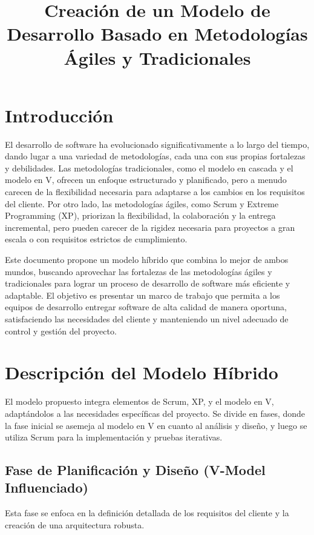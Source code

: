\documentclass{article}
\title{Creación de un Modelo de Desarrollo Basado en Metodologías Ágiles y Tradicionales}
\author{}
\date{}
\begin{document}
\maketitle

\section{Introducción}

El desarrollo de software ha evolucionado significativamente a lo largo del tiempo, dando lugar a una variedad de metodologías, cada una con sus propias fortalezas y debilidades.  Las metodologías tradicionales, como el modelo en cascada y el modelo en V, ofrecen un enfoque estructurado y planificado, pero a menudo carecen de la flexibilidad necesaria para adaptarse a los cambios en los requisitos del cliente.  Por otro lado, las metodologías ágiles, como Scrum y Extreme Programming (XP), priorizan la flexibilidad, la colaboración y la entrega incremental, pero pueden carecer de la rigidez necesaria para proyectos a gran escala o con requisitos estrictos de cumplimiento.

Este documento propone un modelo híbrido que combina lo mejor de ambos mundos, buscando aprovechar las fortalezas de las metodologías ágiles y tradicionales para lograr un proceso de desarrollo de software más eficiente y adaptable. El objetivo es presentar un marco de trabajo que permita a los equipos de desarrollo entregar software de alta calidad de manera oportuna, satisfaciendo las necesidades del cliente y manteniendo un nivel adecuado de control y gestión del proyecto.

\section{Descripción del Modelo Híbrido}

El modelo propuesto integra elementos de Scrum, XP, y el modelo en V, adaptándolos a las necesidades específicas del proyecto. Se divide en fases, donde la fase inicial se asemeja al modelo en V en cuanto al análisis y diseño, y luego se utiliza Scrum para la implementación y pruebas iterativas.

\subsection{Fase de Planificación y Diseño (V-Model Influenciado)}

Esta fase se enfoca en la definición detallada de los requisitos del cliente y la creación de una arquitectura robusta.
\end{document}
